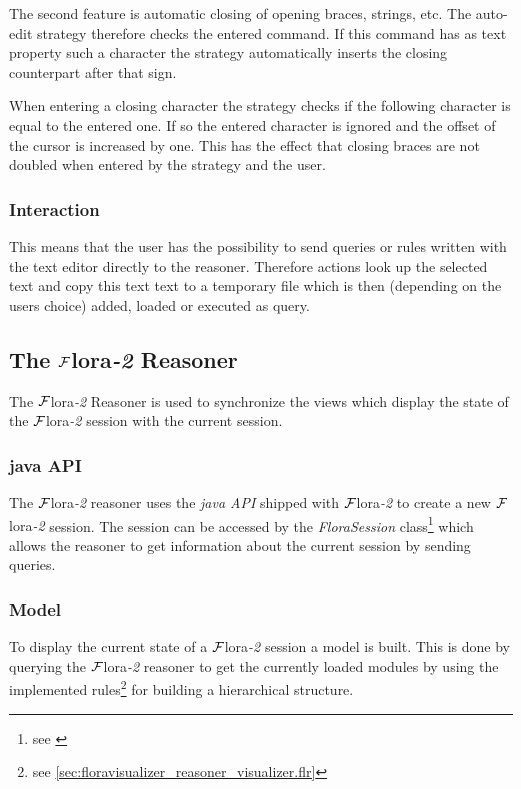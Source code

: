 \documentclass[a4paper,11pt]{article}
\newcommand{\FLORA}{{\mbox{\sc ${\cal F}${lora}\rm\emph{-2}}}\xspace}
\begin{document}
The second feature is automatic closing of opening braces, strings, etc.
The auto-edit strategy therefore checks the entered command. If this command
has as text property such a character the strategy automatically inserts the
closing counterpart after that sign.

When entering a closing character the strategy checks if the following character
is equal to the entered one. If so the entered character is ignored and the offset
of the cursor is increased by one. This has the effect that closing braces are not
doubled when entered by the strategy and the user.

\subsubsection{Interaction}
This means that the user has the possibility to send queries or rules
written with the text editor directly to the reasoner. Therefore actions
look up the selected text and copy this text text to a temporary file
which is then (depending on the users choice) added, loaded or executed as
query.

\subsection{The \FLORA Reasoner}
\label{sec:floravisualizer_reasoner}
The \FLORA Reasoner is used to synchronize the views which display the state
of the \FLORA session with the current session.

\subsubsection{java API}
\label{sec:floravisualizer_reasoner_javaAPI}
The \FLORA reasoner uses the \emph{java API} shipped with \FLORA to create
a new \FLORA session. The session can be accessed by the \emph{FloraSession}
class\footnote{
see \cite{flora-manual}} which allows the reasoner to get information about the
current session by sending queries.

\subsubsection{Model}
\label{sec:floravisualizer_reasoner_model}
To display the current state of a \FLORA session a model is built. This is done
by querying the \FLORA reasoner to get the currently loaded modules by using
the implemented rules\footnote{
see \ref{sec:floravisualizer_reasoner_visualizer.flr}}
for building a hierarchical structure.
\end{document}
